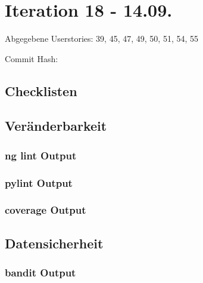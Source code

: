 \section{Iteration 18 - 14.09.}
	Abgegebene Userstories: 39, 45, 47, 49, 50, 51, 54, 55
	
	Commit Hash: 
	
	\subsection*{Checklisten}
	
	
	
	
	
	
	
	
	
	\subsection*{Veränderbarkeit}
	\subsubsection*{ng lint Output}
	

	\subsubsection*{pylint Output}
	

	\subsubsection*{coverage Output}
	

	\subsection*{Datensicherheit}
	\subsubsection*{bandit Output}
	
	
